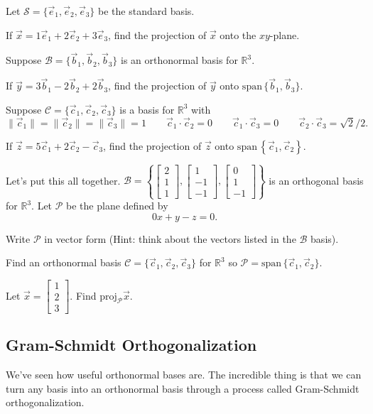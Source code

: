 \documentclass[14pt]{problemset}
\newcommand{\R}{\mathbb{R}}
\newcommand{\proj}{\mathrm{proj}}
\renewcommand{\span}{\mathrm{span}\,}
\newcommand{\mat}[1]{\begin{bmatrix}#1\end{bmatrix}}
\begin{document}
	\question
	Let $\mathcal S=\{\vec e_1,\vec e_2,\vec e_3\}$ be the standard basis.
	\begin{parts}
		\item If $\vec x=1\vec e_1+2\vec e_2+3\vec e_3$, find the projection of $\vec x$
			onto the $xy$-plane.
	\end{parts}
	Suppose $\mathcal B=\{\vec b_1,\vec b_2,\vec b_3\}$ is an orthonormal basis for $\R^3$.
	\begin{parts}[resume]
		\item If $\vec y=3\vec b_1-2\vec b_2+2\vec b_3$, find the projection of $\vec y$
			onto $\span\{\vec b_1,\vec b_3\}$.
	\end{parts}
	Suppose $\mathcal C=\{\vec c_1,\vec c_2,\vec c_3\}$ is a basis for $\R^3$ with
	\[
		\|\vec c_1\| = 
		\|\vec c_2\| = 
		\|\vec c_3\| = 1\qquad \vec c_1\cdot \vec c_2=0\qquad \vec c_1\cdot \vec c_3=0
		\qquad \vec c_2\cdot \vec c_3=\sqrt{2}/2.
	\]
	\vspace{-.35in}
	\begin{parts}[resume]
		\item If $\vec z=5\vec c_1+2\vec c_2-\vec c_3$, find the projection of $\vec z$
			onto $\span\left\{\vec c_1,\vec c_2\right\}$.
	\end{parts}

	\question
	Let's put this all together.  
	$\mathcal B=\left\{\mat{2\\1\\1},\mat{1\\-1\\-1},\mat{0\\1\\-1}\right\}$ is an
	orthogonal basis for $\R^3$.  Let $\mathcal P$ be the plane defined
	by
	\[
		0x+y-z=0.
	\]
	\begin{parts}
		\item Write $\mathcal P$ in vector form (Hint: think about the vectors
			listed in the $\mathcal B$ basis).
		\item Find an orthonormal basis $\mathcal C=\{\vec c_1,\vec c_2,\vec c_3\}$
			for $\R^3$ so $\mathcal P=\span\{\vec c_1,\vec c_2\}$.
		\item Let $\vec x=\mat{1\\2\\3}$.  Find $\proj_{\mathcal P}\vec x$.
	\end{parts}

\subsection*{Gram-Schmidt Orthogonalization}
	We've seen how useful orthonormal bases are.  The incredible thing is that we can 
	turn any basis into an orthonormal basis through a process called
	Gram-Schmidt orthogonalization.
\end{document}
